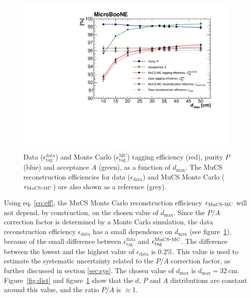 \documentclass[a4paper,11pt]{article}
\def\myhyphen{{\hbox{-}}}
\begin{document}
\begin{figure}[htbp]
  \begin{center}
    \includegraphics[width=0.7\linewidth]{figures/purity.pdf}
    \caption{Data ($\epsilon^{\mathrm{data}}_{\mathrm{tag}}$) and Monte Carlo ($\epsilon^{\mathrm{MC}}_{\mathrm{tag}}$) tagging efficiency (red), purity $P$ (blue) and acceptance $A$ (green), as a function of $d_{\mathrm{max}}$. The MuCS reconstruction efficiencies for data ($\epsilon_{\mathrm{data}}$) and MuCS Monte Carlo ($\epsilon_{\mathrm{MuCS\myhyphen MC}}$) are also shown as a reference (grey).} \label{fig:purity}
  \end{center}
\end{figure}

Using eq. \eqref{eq:eff}, the MuCS Monte Carlo reconstruction efficiency $\epsilon_{\mathrm{MuCS\myhyphen MC}}$ will not depend, by construction, on the chosen value of $d_{\mathrm{max}}$. Since the $P/A$ correction factor is determined by a Monte Carlo simulation, the data reconstruction efficiency $\epsilon_{\mathrm{data}}$ has a small dependence on $d_{\mathrm{max}}$ (see figure~\ref{fig:purity}), because of the small difference between $\epsilon^{\mathrm{data}}_{\mathrm{tag}}$ and $\epsilon^{\mathrm{MuCS\myhyphen MC}}_{\mathrm{tag}}$.
The difference between the lowest and the highest value of $\epsilon_{\mathrm{data}}$ is $0.2\%$. This value is used to estimate the systematic uncertainty related to the $P/A$ correction factor, as further discussed in section \ref{sec:sys}.
The chosen value of $d_{\mathrm{max}}$ is $d_{\mathrm{max}}=32~\mathrm{cm}$. Figure~\ref{fig:dist} and figure~\ref{fig:purity} show that the $d$, $P$ and $A$ distributions are constant around this value, and the ratio $P/A$ is $\approx$1.%

\end{document}
